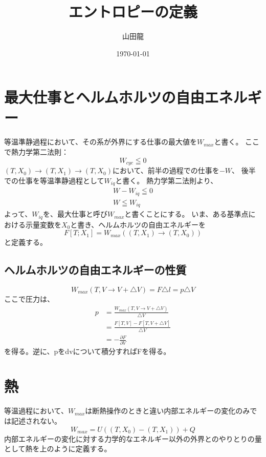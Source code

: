 \documentclass{jsarticle}
\date{\today}
\author{山田龍}
\title{エントロピーの定義}
\newcommand{\pder}[2][]{\frac{\partial#1}{\partial#2}}
\begin{document}
\maketitle
\section{最大仕事とヘルムホルツの自由エネルギー}
等温準静過程において、その系が外界にする仕事の最大値を$W_{max}$と書く。
ここで熱力学第二法則：
\begin{equation}
    W_{cyc} \leqq 0
\end{equation}
$(T, X_0) \rightarrow (T, X_1) \rightarrow (T, X_0)$において、前半の過程での仕事を$-W$、
後半での仕事を等温準静過程として$W_{iq}$と書く。
熱力学第二法則より、
\begin{align}
    W - W_{iq} \leqq 0\\
    W \leqq W_{iq}
\end{align}
よって、$W_{iq}$を、最大仕事と呼び$W_{max}$と書くことにする。
いま、ある基準点における示量変数を$X_0$と書き、ヘルムホルツの自由エネルギーを
\begin{equation}
    F[T; X_1] = W_{max}((T, X_1) \rightarrow (T, X_0))
\end{equation}
と定義する。
\subsection{ヘルムホルツの自由エネルギーの性質}
\begin{equation}
    W_{max}(T,V \rightarrow V + \triangle V) = F \triangle l = p \triangle V
\end{equation}
ここで圧力は、
\begin{align}
    p &= \frac{W_{max}(T,V \rightarrow V + \triangle V)}{\triangle V} \\
      &= \frac{F[T, V] - F[T, V + \triangle V]}{\triangle V}\\ 
      &= - \pder[F]{V}
\end{align}
を得る。逆に、pをdvについて積分すればFを得る。
\section{熱}
等温過程において、$W_{max}$は断熱操作のときと違い内部エネルギーの変化のみでは記述されない。
\begin{equation}
    W_{max} = U((T, X_0) - (T, X_1)) + Q
\end{equation}
内部エネルギーの変化に対する力学的なエネルギー以外の外界とのやりとりの量として熱を上のように定義する。
\end{document}
